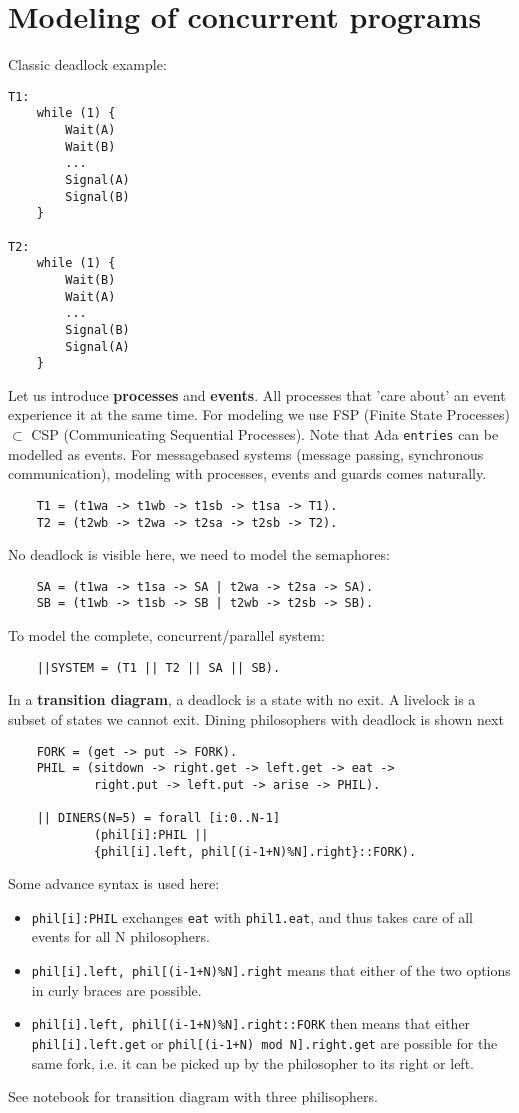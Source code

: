 \part{Modeling of concurrent programs}
Classic deadlock example:
\begin{verbatim}
T1:
    while (1) {
        Wait(A)
        Wait(B)
        ...
        Signal(A)
        Signal(B)
    }

T2:
    while (1) {
        Wait(B)
        Wait(A)
        ... 
        Signal(B)
        Signal(A)
    }
\end{verbatim}
Let us introduce \textbf{processes} and \textbf{events}. All processes that 'care about' an event experience it at the same time. For modeling we use FSP (Finite State Processes) $\subset$ CSP (Communicating Sequential Processes). Note that Ada \texttt{entries} can be modelled as events. For messagebased systems (message passing, synchronous communication), modeling with processes, events and guards comes naturally.  
\begin{verbatim}
    T1 = (t1wa -> t1wb -> t1sb -> t1sa -> T1).
    T2 = (t2wb -> t2wa -> t2sa -> t2sb -> T2).
\end{verbatim}
No deadlock is visible here, we need to model the semaphores:
\begin{verbatim}
    SA = (t1wa -> t1sa -> SA | t2wa -> t2sa -> SA).
    SB = (t1wb -> t1sb -> SB | t2wb -> t2sb -> SB).
\end{verbatim}
To model the complete, concurrent/parallel system:
\begin{verbatim}
    ||SYSTEM = (T1 || T2 || SA || SB).
\end{verbatim}
In a \textbf{transition diagram}, a deadlock is a state with no exit. A livelock is a subset of states we cannot exit. Dining philosophers with deadlock is shown next
\begin{verbatim}
    FORK = (get -> put -> FORK).
    PHIL = (sitdown -> right.get -> left.get -> eat ->
            right.put -> left.put -> arise -> PHIL).
    
    || DINERS(N=5) = forall [i:0..N-1]
            (phil[i]:PHIL ||
            {phil[i].left, phil[(i-1+N)%N].right}::FORK).
\end{verbatim}
Some advance syntax is used here:
\begin{itemize}
    \item \texttt{phil[i]:PHIL} exchanges \texttt{eat} with \texttt{phil1.eat}, and thus takes care of all events for all N philosophers.
    \item \texttt{{phil[i].left, phil[(i-1+N)\%N].right}} means that either of the two options in curly braces are possible.
    \item \texttt{{phil[i].left, phil[(i-1+N)\%N].right}::FORK} then means that either \texttt{phil[i].left.get} or \texttt{phil[(i-1+N) mod N].right.get} are possible for the same fork, i.e. it can be picked up by the philosopher to its right or left.
\end{itemize}
See notebook for transition diagram with three philisophers.
